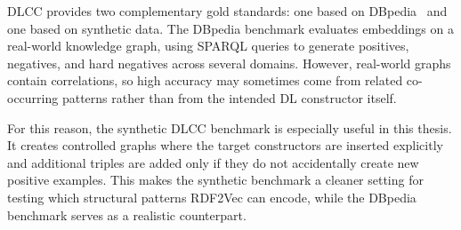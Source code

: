 \documentclass[a4paper,oneside,bibliography=totoc]{scrbook}
\begin{document}
DLCC provides two complementary gold standards: one based on
DBpedia~\cite{lehmann_dbpedia_2015} and one based on synthetic data. The DBpedia benchmark evaluates embeddings on a
real-world knowledge graph, using SPARQL queries to generate positives,
negatives, and hard negatives across several domains. However, real-world graphs
contain correlations, so high accuracy may sometimes come from related co-occurring
patterns rather than from the intended DL constructor itself.

For this reason, the synthetic DLCC benchmark is especially useful in this
thesis. It creates controlled graphs where the target constructors are inserted
explicitly and additional triples are added only if they do not accidentally
create new positive examples. This makes the synthetic benchmark a cleaner
setting for testing which structural patterns RDF2Vec can encode, while the
DBpedia benchmark serves as a realistic counterpart.
\end{document}
